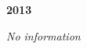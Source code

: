 \begin{center}
  \Huge
  \textbf{2013}
\end{center}

\begin{center}
  \textit{No information}
\end{center}

\vspace{50mm}

\pagebreak
